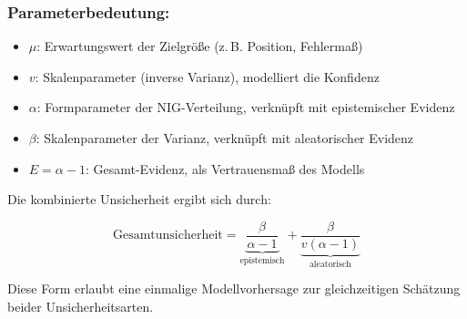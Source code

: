 \begin{otherlanguage}{ngerman}
\subsubsection*{Parameterbedeutung:}
\begin{itemize}
  \item $\mu$: Erwartungswert der Zielgröße (z.\,B. Position, Fehlermaß)
  \item $v$: Skalenparameter (inverse Varianz), modelliert die Konfidenz
  \item $\alpha$: Formparameter der NIG-Verteilung, verknüpft mit epistemischer Evidenz
  \item $\beta$: Skalenparameter der Varianz, verknüpft mit aleatorischer Evidenz
  \item $E = \alpha - 1$: Gesamt-Evidenz, als Vertrauensmaß des Modells
\end{itemize}

Die kombinierte Unsicherheit ergibt sich durch:

\begin{equation}
\text{Gesamtunsicherheit} = \underbrace{\frac{\beta}{\alpha - 1}}_{\text{epistemisch}} + \underbrace{\frac{\beta}{v(\alpha - 1)}}_{\text{aleatorisch}}
\end{equation}

Diese Form erlaubt eine einmalige Modellvorhersage zur gleichzeitigen Schätzung beider Unsicherheitsarten.  
\end{otherlanguage}







